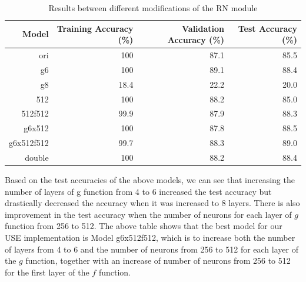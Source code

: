 \documentclass{article}
\begin{document}
 \begin{table}[H]

\begin{center}

\begin{tabular}{|r|r|r|r|}

 

\hline

\textbf{Model}&\textbf{Training Accuracy (\%)}&\textbf{Validation Accuracy (\%)}&\textbf{Test Accuracy (\%)}\\

\hline

ori&100&87.1&85.5\\

\hline

g6&100&89.1&88.4\\

\hline

g8&18.4&22.2&20.0\\

\hline

512&100&88.2&85.0\\

\hline

512f512&99.9&87.9&88.3\\

\hline

g6x512&100&87.8&88.5\\

\hline

g6x512f512&99.7&88.3&89.0\\

\hline

double&100&88.2&88.4\\

\hline

 

\end{tabular}
\label{tab:diffmod}
\end{center}

\caption{Results between different modifications of the RN module}
\end{table} 

 

Based on the test accuracies of the above models, we can see that increasing the number of layers of g function from 4 to 6 increased the test accuracy but drastically decreased the accuracy when it was increased to 8 layers. There is also improvement in the test accuracy when the number of neurons for each layer of $g$ function from 256 to 512. The above table shows that the best model for our USE implementation is Model g6x512f512, which is to increase both the number of layers from 4 to 6 and the number of neurons from 256 to 512 for each layer of the $g$ function, together with an increase of number of neurons from 256 to 512 for the first layer of the $f$ function.
\end{document}
